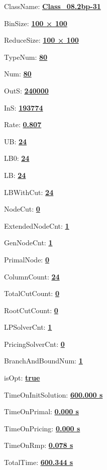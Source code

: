 \documentclass[11pt]{article}
\begin{document}
\pagestyle{empty}


ClassName: \underline{\textbf{Class_08.2bp-31}}
\par
BinSize: \underline{\textbf{100 × 100}}
\par
ReduceSize: \underline{\textbf{100 × 100}}
\par
TypeNum: \underline{\textbf{80}}
\par
Num: \underline{\textbf{80}}
\par
OutS: \underline{\textbf{240000}}
\par
InS: \underline{\textbf{193774}}
\par
Rate: \underline{\textbf{0.807}}
\par
UB: \underline{\textbf{24}}
\par
LB0: \underline{\textbf{24}}
\par
LB: \underline{\textbf{24}}
\par
LBWithCut: \underline{\textbf{24}}
\par
NodeCut: \underline{\textbf{0}}
\par
ExtendedNodeCnt: \underline{\textbf{1}}
\par
GenNodeCnt: \underline{\textbf{1}}
\par
PrimalNode: \underline{\textbf{0}}
\par
ColumnCount: \underline{\textbf{24}}
\par
TotalCutCount: \underline{\textbf{0}}
\par
RootCutCount: \underline{\textbf{0}}
\par
LPSolverCnt: \underline{\textbf{1}}
\par
PricingSolverCnt: \underline{\textbf{0}}
\par
BranchAndBoundNum: \underline{\textbf{1}}
\par
isOpt: \underline{\textbf{true}}
\par
TimeOnInitSolution: \underline{\textbf{600.000 s}}
\par
TimeOnPrimal: \underline{\textbf{0.000 s}}
\par
TimeOnPricing: \underline{\textbf{0.000 s}}
\par
TimeOnRmp: \underline{\textbf{0.078 s}}
\par
TotalTime: \underline{\textbf{600.344 s}}
\par
\newpage


\end{document}
